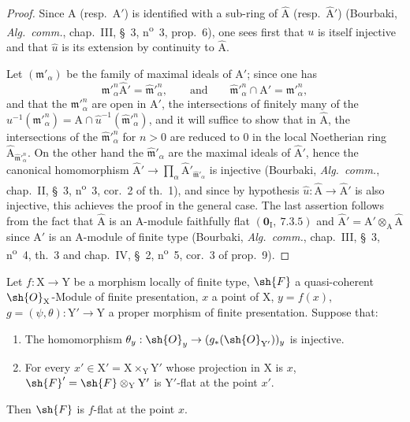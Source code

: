 \begin{proof}
Since $\mathrm{A}$ (resp.\ $\mathrm{A}'$) is identified with a sub-ring of $\hat{\mathrm{A}}$ (resp.\ $\hat{\mathrm{A}}'$) (Bourbaki,
\emph{Alg.\ comm.}, chap.~III, \S~3, n\textsuperscript{o}~3, prop.~6), one sees first that $u$ is itself injective
and that $\hat{u}$ is its extension by continuity to $\hat{\mathrm{A}}$.

Let $(\mathfrak{m}'_\alpha)$ be the family of maximal ideals of $\mathrm{A}'$; since one has
\[
\mathfrak{m}'^n_\alpha\hat{\mathrm{A}}'=\hat{\mathfrak{m}}'^n_\alpha, \qquad \text{and} \qquad \hat{\mathfrak{m}}'^n_\alpha\cap\mathrm{A}'=\mathfrak{m}'^n_\alpha,
\]
and that the $\mathfrak{m}'^n_\alpha$ are open in $\mathrm{A}'$, the intersections of finitely many of the $u^{-1}(\mathfrak{m}'^n_\alpha)=\mathrm{A}\cap\hat{u}^{-1}(\hat{\mathfrak{m}}'^n_\alpha)$, and it will suffice to
show that in $\hat{\mathrm{A}}$, the intersections of the $\hat{\mathfrak{m}}'^n_\alpha$ for $n>0$ are reduced to $0$ in the local Noetherian ring $\hat{\mathrm{A}}_{\hat{\mathfrak{m}}'^n_\alpha}$.
On the other hand the $\hat{\mathfrak{m}}'_\alpha$ are the maximal ideals of $\hat{\mathrm{A}}'$, hence the canonical homomorphism
$\hat{\mathrm{A}}'\to\prod_\alpha\hat{\mathrm{A}}'_{\hat{\mathfrak{m}}'_\alpha}$ is injective (Bourbaki, \emph{Alg.\ comm.}, chap.~II, \S~3, n\textsuperscript{o}~3, cor.~2 of th.~1), and
since by hypothesis $\hat{u}:\hat{\mathrm{A}}\to\hat{\mathrm{A}}'$ is also injective, this achieves the proof in
the general case. The last assertion follows from the fact that $\hat{\mathrm{A}}$ is an $\mathrm{A}$-module faithfully
flat $(\mathbf{0}_\mathrm{I},~7.3.5)$ and $\hat{\mathrm{A}}'=\mathrm{A}'\otimes_\mathrm{A}\hat{\mathrm{A}}$ since $\mathrm{A}'$ is an $\mathrm{A}$-module of finite type
(Bourbaki, \emph{Alg.\ comm.}, chap.~III, \S~3, n\textsuperscript{o}~4, th.~3 and chap.~IV, \S~2, n\textsuperscript{o}~5, cor.~3 of prop.~9).
\end{proof}

\begin{proposition}[11.5.3]
\label{IV.11.5.3}
Let $f:\mathrm{X}\to\mathrm{Y}$ be a morphism locally of finite type,
$\sh{F}$ a quasi-coherent $\sh{O}_\mathrm{X}$-Module of finite presentation, $x$ a point of $\mathrm{X}$, $y=f(x)$, $g=(\psi,\theta):\mathrm{Y}'\to\mathrm{Y}$
a proper morphism of finite presentation. Suppose that:
\begin{enumerate}[label=(\roman*)]
  \item The homomorphism $\theta_y:\sh{O}_y\to(g_*(\sh{O}_{\mathrm{Y}'}))_y$ is injective.
  \item For every $x'\in\mathrm{X}'=\mathrm{X}\times_\mathrm{Y}\mathrm{Y}'$ whose projection in $\mathrm{X}$ is $x$, $\sh{F}'=\sh{F}\otimes_\mathrm{Y}\mathrm{Y}'$ is
  $\mathrm{Y}'$-flat at the point $x'$.
\end{enumerate}

Then $\sh{F}$ is $f$-flat at the point $x$.
\end{proposition}

